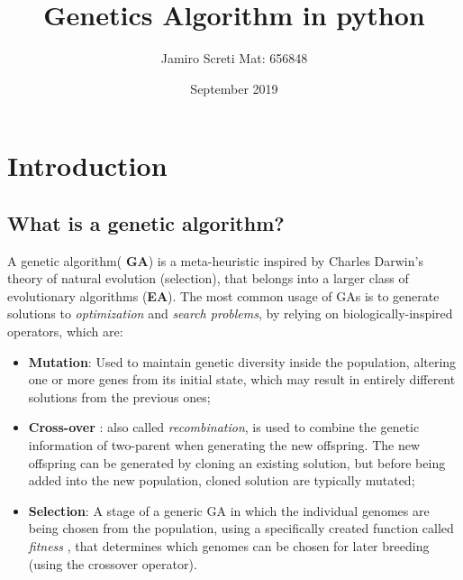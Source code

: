 \documentclass{article}
\title{Genetics Algorithm in python}
\author{Jamiro Screti   Mat: 656848 }
\date{September 2019}
\begin{document}
	
	\maketitle
	
	\tableofcontents
	\section{Introduction}
	\subsection{What is a genetic algorithm?}
	A genetic algorithm( \textbf{GA}) is a meta-heuristic inspired by Charles Darwin's theory of natural evolution (selection), that belongs into a larger class of evolutionary algorithms (\textbf{EA}). \newline
	The most common usage of GAs is to generate solutions to \textit{optimization} and \textit{search problems}, by relying on biologically-inspired operators, which are:
	\begin{itemize}
		\item \textbf{Mutation}: Used to maintain genetic diversity inside the population, altering one or more genes from its initial state, which may result in entirely different solutions from the previous ones;
		\item \textbf{Cross-over} : also called \textit{recombination}, is used to combine the genetic information of two-parent when generating the new offspring. The new offspring can be generated by cloning an existing solution, but before being added into the new population, cloned solution are typically mutated;
		\item \textbf{Selection}: A stage of a generic GA in which the individual genomes are being chosen from the population, using a specifically created function called \textit{fitness }, that determines which genomes can be chosen for later breeding (using the crossover operator).
	\end{itemize}
\end{document}

